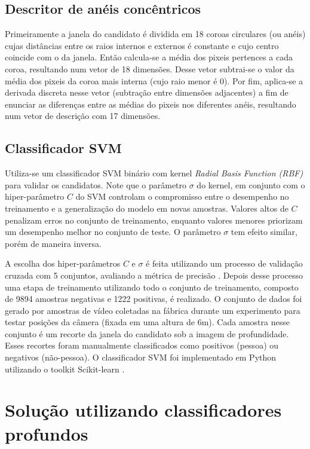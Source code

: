     \subsection{Descritor de anéis concêntricos}
       Primeiramente a janela do candidato é dividida em 18 coroas circulares (ou anéis) cujas distâncias entre os raios internos e externos é constante e cujo centro coincide com o da janela. Então calcula-se a média dos pixeis pertences a cada coroa, resultando num vetor de 18 dimensões. Desse vetor subtrai-se o valor da média dos pixeis da coroa mais interna (cujo raio menor é 0). Por fim, aplica-se a derivada discreta nesse vetor (subtração entre dimensões adjacentes) a fim de enunciar as diferenças entre as médias do pixeis nos diferentes anéis, resultando num vetor de descrição com 17 dimensões.

    \subsection{Classificador SVM}
      Utiliza-se um classificador SVM binário com kernel \textit{Radial Basis Function (RBF)} \cite{rbfkernel} para validar os candidatos. Note que o parâmetro $\sigma$ do kernel, em conjunto com o hiper-parâmetro $C$ do SVM controlam o compromisso entre o desempenho no treinamento e a generalização do modelo em novas amostras. Valores altos de $C$ penalizam erros no conjunto de treinamento, enquanto valores menores priorizam um desempenho melhor no conjunto de teste. O parâmetro $\sigma$ tem efeito similar, porém de maneira inversa.

      A escolha dos hiper-parâmetros $C$ e $\sigma$ é feita utilizando um processo de validação cruzada com 5 conjuntos, avaliando a métrica de precisão \cite{evaluationMetrics}. Depois desse processo uma etapa de treinamento utilizando todo o conjunto de treinamento, composto de 9894 amostras negativas e 1222 positivas, é realizado. O conjunto de dados foi gerado por amostras de vídeo coletadas na fábrica durante um experimento para testar posições da câmera (fixada em uma altura de 6m). Cada amostra nesse conjunto é um recorte da janela do candidato sob a imagem de profundidade. Esses recortes foram manualmente classificados como positivos (pessoa) ou negativos (não-pessoa). O classificador SVM foi implementado em Python utilizando o toolkit Scikit-learn \cite{scikit-learn}.


\section{Solução utilizando classificadores profundos}
\label{sec:deep}

